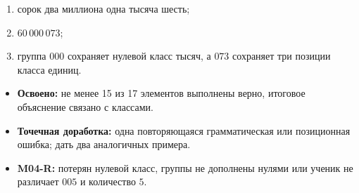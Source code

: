 \begin{teacherbox}[5. Итог]
  \begin{enumerate}
    \item сорок два миллиона одна тысяча шесть;
    \item \(60\,000\,073\);
    \item группа \(000\) сохраняет нулевой класс тысяч, а \(073\) сохраняет три
      позиции класса единиц.
  \end{enumerate}
\end{teacherbox}

\begin{resultbox}
  \begin{itemize}
    \item \textbf{Освоено:} не менее 15 из 17 элементов выполнены верно,
      итоговое объяснение связано с классами.
    \item \textbf{Точечная доработка:} одна повторяющаяся грамматическая или
      позиционная ошибка; дать два аналогичных примера.
    \item \textbf{M04-R:} потерян нулевой класс, группы не дополнены нулями или
      ученик не различает \(005\) и количество \(5\).
  \end{itemize}
\end{resultbox}
